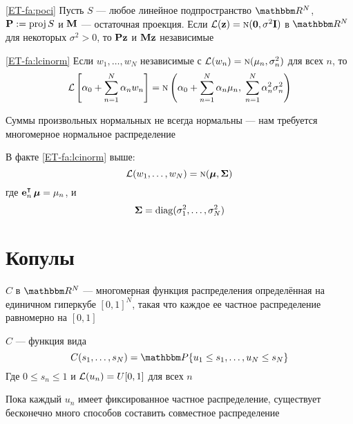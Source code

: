 \begin{frame}

    \vspace{2em}
    \Fact\eqref{ET-fa:poci}
    Пусть $S$ --- любое линейное подпространство $\RR^N$, $\mathbf P := \operatorname{proj} S$ и
    $\mathbf M$ --- остаточная проекция. Если $\mathcal L({\mathbf z}) = \textrm{\sc n}({\mathbf 0},
    \sigma^2 \mathbf I)$ в $\RR^N$ для некоторых $\sigma^2 > 0$, то $\mathbf P {\mathbf z}$ и
    $\mathbf M {\mathbf z}$ независимые
    
    \vspace{1em}
    \Fact\eqref{ET-fa:lcinorm}
        Если $w_1, \ldots, w_N$ независимые с $\mathcal L(w_n) = \textrm{\sc n}(\mu_n,
        \sigma_n^2)$ для всех $n$, то
        \begin{equation*}
            \mathcal L \left[ \alpha_0 + \sum_{n=1}^N \alpha_n w_n \right]
            = \textrm{\sc n} \left( 
                \alpha_0 + \sum_{n=1}^N \alpha_n \mu_n,\;
                \sum_{n=1}^N \alpha_n^2 \sigma_n^2
                \right)
        \end{equation*}
\end{frame}

\begin{frame}

    \vspace{1em}
    Суммы произвольных нормальных не всегда нормальны --- нам требуется 
    многомерное нормальное распределение
    
    \vspace{1em}
    В факте \eqref{ET-fa:lcinorm} выше:
    $$\mathcal L(w_1, \ldots, w_N) = \textrm{\sc n}({\boldsymbol \mu},
    {\boldsymbol \Sigma})$$ 
    где $\bolde_n^\T \, \boldmu = \mu_n$, и
    $${\boldsymbol \Sigma} =
    \operatorname{diag}(\sigma_1^2, \ldots, \sigma_N^2)$$
 
    
\end{frame}

\section{Копулы}

\begin{frame}

    \vspace{2em}
     $C$ в $\RR^N$ --- многомерная функция распределения определённая на
    единичном гиперкубе $[0, 1]^N$, такая что
    каждое ее частное распределение равномерно на $[0, 1]$
    
    $C$ --- функция вида
    \begin{equation}
        \label{eq:icif}
        C(s_1, \ldots, s_N) = \PP \{u_1 \leq s_1, \ldots, u_N \leq s_N\}
    \end{equation}
    Где $0 \leq s_n \leq 1$ и $\mathcal L(u_n) = U[0, 1]$ для всех $n$
    
    \vspace{1em}
    Пока каждый $u_n$ имеет фиксированное частное распределение, существует 
    бесконечно много способов составить совместное распределение
        
\end{frame}

